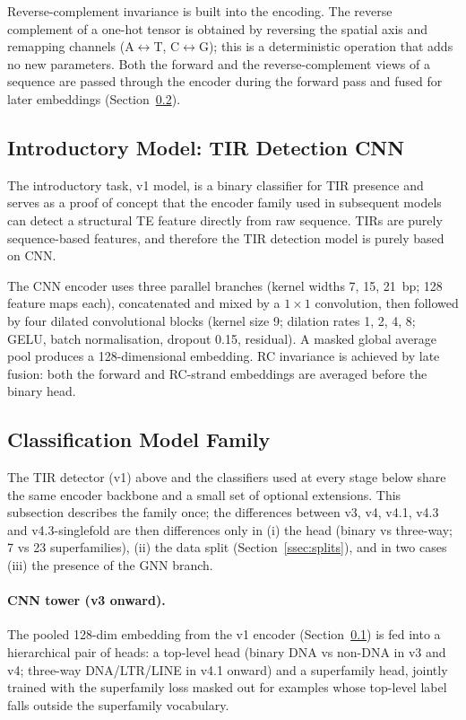 \documentclass[12pt]{article}
\begin{document}
Reverse-complement invariance is built into the encoding. The reverse complement of a one-hot tensor is obtained by reversing the spatial axis and remapping channels (A$\leftrightarrow$T, C$\leftrightarrow$G); this is a deterministic operation that adds no new parameters. Both the forward and the reverse-complement views of a sequence are passed through the encoder during the forward pass and fused for later embeddings (Section~\ref{ssec:methods_family}).

\subsection{Introductory Model: TIR Detection CNN}\label{ssec:methods_v1}

The introductory task, v1 model, is a binary classifier for TIR presence and serves as a proof of concept that the encoder family used in subsequent models can detect a structural TE feature directly from raw sequence. TIRs are purely sequence-based features, and therefore the TIR detection model is purely based on CNN. 

The CNN encoder uses three parallel branches (kernel widths 7, 15, 21~bp; 128 feature maps each), concatenated and mixed by a $1\!\times\!1$ convolution, then followed by four dilated convolutional blocks (kernel size 9; dilation rates 1, 2, 4, 8; GELU, batch normalisation, dropout 0.15, residual). A masked global average pool produces a 128-dimensional embedding. RC invariance is achieved by late fusion: both the forward and RC-strand embeddings are averaged before the binary head. 

\subsection{Classification Model Family}\label{ssec:methods_family}

The TIR detector (v1) above and the classifiers used at every stage below share the same encoder backbone and a small set of optional extensions. This subsection describes the family once; the differences between v3, v4, v4.1, v4.3 and v4.3-singlefold are then differences only in (i) the head (binary vs three-way; 7 vs 23 superfamilies), (ii) the data split (Section~\ref{ssec:splits}), and in two cases (iii) the presence of the GNN branch.

\paragraph{CNN tower (v3 onward).} The pooled 128-dim embedding from the v1 encoder (Section~\ref{ssec:methods_v1}) is fed into a hierarchical pair of heads: a top-level head (binary DNA vs non-DNA in v3 and v4; three-way DNA/LTR/LINE in v4.1 onward) and a superfamily head, jointly trained with the superfamily loss masked out for examples whose top-level label falls outside the superfamily vocabulary.
\end{document}
